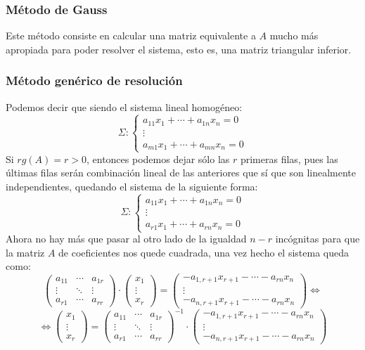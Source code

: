 \documentclass[10pt,a4paper,openright]{book}
\theoremstyle{break}
\begin{document}
\subsubsection{Método de Gauss}
Este método consiste en calcular una matriz equivalente a $A$ mucho más apropiada para poder resolver el sistema, esto es, una matriz triangular inferior.

\subsubsection{Método genérico de resolución}
Podemos decir que siendo el sistema lineal homogéneo:
$$\Sigma: \begin{cases}a_{11} x_1+\cdots+a_{1n}x_n=0 \\ \vdots \\ a_{m1}x_1+\cdots+a_{mn}x_n=0\end{cases}$$
Si $rg(A) = r> 0$, entonces podemos dejar sólo las $r$ primeras filas, pues las últimas filas serán combinación lineal de las anteriores que sí que son linealmente independientes, quedando el sistema de la siguiente forma:
$$\Sigma: \begin{cases}a_{11} x_1+\cdots+a_{1n}x_n=0 \\ \vdots \\ a_{r1}x_1+\cdots+a_{rn}x_n=0\end{cases}$$
Ahora no hay más que pasar al otro lado de la igualdad $n-r$ incógnitas para que la matriz $A$ de coeficientes nos quede cuadrada, una vez hecho el sistema queda como:
$$\begin{pmatrix}
a_{11} &\cdots & a_{1r} \\ \vdots & \ddots & \vdots \\ a_{r1}  & \cdots & a_{rr}\end{pmatrix} \cdot \begin{pmatrix}
x_1 \\ \vdots \\ x_r
\end{pmatrix}=\begin{pmatrix}
-a_{1,r+1}x_{r+1}-\cdots-a_{rn}x_n \\ \vdots \\ -a_{n,r+1}x_{r+1}-\cdots-a_{rn}x_n
\end{pmatrix}\Leftrightarrow $$
$$\Leftrightarrow \begin{pmatrix}
x_1 \\ \vdots \\ x_r
\end{pmatrix}=\begin{pmatrix}
a_{11} &\cdots & a_{1r} \\ \vdots & \ddots & \vdots \\ a_{r1}  & \cdots & a_{rr}\end{pmatrix}^{-1} \cdot \begin{pmatrix}
-a_{1,r+1}x_{r+1}-\cdots-a_{rn}x_n \\ \vdots \\ -a_{n,r+1}x_{r+1}-\cdots-a_{rn}x_n
\end{pmatrix}$$
\end{document}
